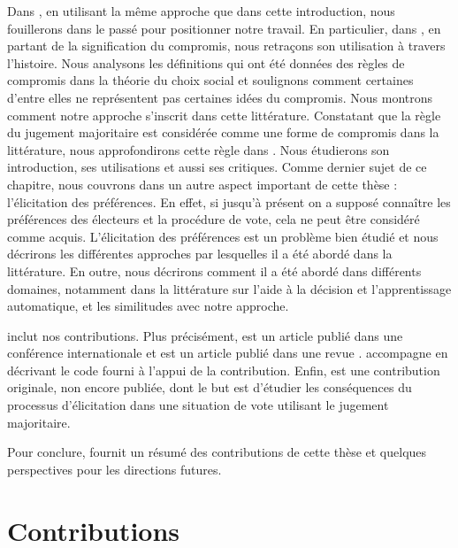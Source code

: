 	Dans , en utilisant la même approche que dans cette introduction, nous fouillerons dans le passé pour positionner notre travail. En particulier, dans , en partant de la signification du compromis, nous retraçons son utilisation à travers l'histoire. Nous analysons les définitions qui ont été données des règles de compromis dans la théorie du choix social et soulignons comment certaines d'entre elles ne représentent pas certaines idées du compromis. Nous montrons comment notre approche s'inscrit dans cette littérature. 
	Constatant que la règle du jugement majoritaire est considérée comme une forme de compromis dans la littérature, nous approfondirons cette règle dans . Nous étudierons son introduction, ses utilisations et aussi ses critiques.
	Comme dernier sujet de ce chapitre, nous couvrons dans  un autre aspect important de cette thèse : l'élicitation des préférences. En effet, si jusqu'à présent on a supposé connaître les préférences des électeurs et la procédure de vote, cela ne peut être considéré comme acquis. L'élicitation des préférences est un problème bien étudié et nous décrirons les différentes approches par lesquelles il a été abordé dans la littérature. En outre, nous décrirons comment il a été abordé dans différents domaines, notamment dans la littérature sur l'aide à la décision et l'apprentissage automatique, et les similitudes avec notre approche.
	
	 inclut nos contributions. Plus précisément,  est un article publié dans une conférence internationale \citep{Napolitano2021} et  est un article publié dans une revue \citep{Cailloux2022}.  accompagne  en décrivant le code fourni à l'appui de la contribution. 
	Enfin,  est une contribution originale, non encore publiée, dont le but est d'étudier les conséquences du processus d'élicitation dans une situation de vote utilisant le jugement majoritaire.
	
	Pour conclure,  fournit un résumé des contributions de cette thèse et quelques perspectives pour les directions futures.


\section*{Contributions}

